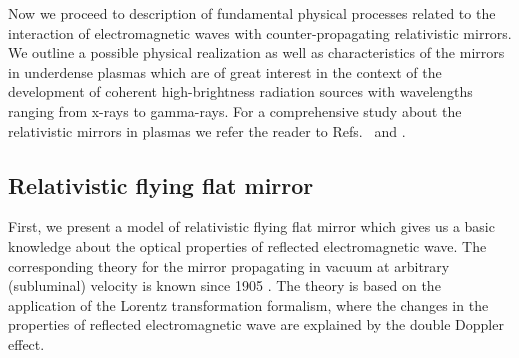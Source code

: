 \documentclass[10pt, a4paper, twoside, openright]{report}
\begin{document}
%

%

%

%

Now we proceed to description of fundamental physical processes related to the interaction of electromagnetic waves with counter-propagating relativistic mirrors. We outline a possible physical realization as well as characteristics of the mirrors in underdense plasmas which are of great interest in the context of the development of coherent high-brightness radiation sources with wavelengths ranging from x-rays to gamma-rays. For a comprehensive study about the relativistic mirrors in plasmas we refer the reader to Refs.~ and .


\subsection{Relativistic flying flat mirror\label{sec:rffm}}


First, we present a model of relativistic flying flat mirror which gives us a basic knowledge about the optical properties of reflected electromagnetic wave. The corresponding theory for the mirror propagating in vacuum at arbitrary (subluminal) velocity is known since 1905 \cite{Einstein1905}. The theory is based on the application of the Lorentz transformation formalism, where the changes in the properties of reflected electromagnetic wave are explained by the double Doppler effect.
\end{document}
